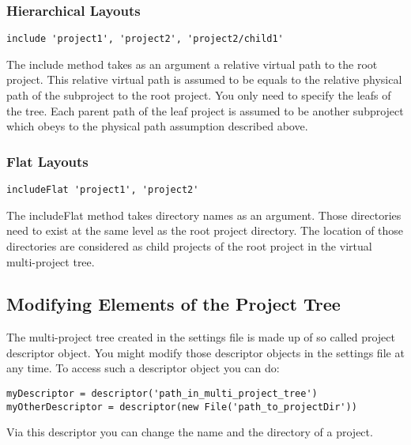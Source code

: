 \subsubsection{Hierarchical Layouts} %
\begin{Verbatim}
include 'project1', 'project2', 'project2/child1'
\end{Verbatim}
The include method takes as an argument a relative virtual path to the root project. This relative virtual path is assumed to be equals to the relative physical path of the subproject to the root project. You only need to specify the leafs of the tree. Each parent path of the leaf project is assumed to be another subproject which obeys to the physical path assumption described above.
\subsubsection{Flat Layouts} %
\begin{Verbatim}
includeFlat 'project1', 'project2'
\end{Verbatim}
The includeFlat method takes directory names as an argument. Those directories need to exist at the same level as the root project directory. The location of those directories are considered as child projects of the root project in the virtual multi-project tree.

\subsection{Modifying Elements of the Project Tree} %
\label{sub:modifying_element_of_the_project_tree}
The multi-project tree created in the settings file is made up of so called project descriptor object. You might modify those descriptor objects in the settings file at any time. To access such a descriptor object you can do:
\begin{Verbatim}
myDescriptor = descriptor('path_in_multi_project_tree')
myOtherDescriptor = descriptor(new File('path_to_projectDir')) 
\end{Verbatim}
Via this descriptor you can change the name and the directory of a project.

